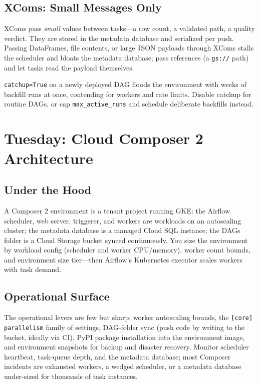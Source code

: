 \subsection{XComs: Small Messages Only}
XComs pass \emph{small} values between tasks---a row count, a validated path, a quality verdict. They are stored in the metadata database and serialized per push. Passing DataFrames, file contents, or large JSON payloads through XComs stalls the scheduler and bloats the metadata database; pass references (a \texttt{gs://} path) and let tasks read the payload themselves.

\begin{pitfall}
\texttt{catchup=True} on a newly deployed DAG floods the environment with weeks of backfill runs at once, contending for workers and rate limits. Disable catchup for routine DAGs, or cap \texttt{max\_active\_runs} and schedule deliberate backfills instead.
\end{pitfall}

\section{Tuesday: Cloud Composer 2 Architecture}

\subsection{Under the Hood}
A Composer 2 environment is a tenant project running GKE: the Airflow scheduler, web server, triggerer, and workers are workloads on an autoscaling cluster; the metadata database is a managed Cloud SQL instance; the DAGs folder is a Cloud Storage bucket synced continuously. You size the environment by workload config (scheduler and worker CPU/memory), worker count bounds, and environment size tier---then Airflow's Kubernetes executor scales workers with task demand.

\subsection{Operational Surface}
The operational levers are few but sharp: worker autoscaling bounds, the \texttt{[core] parallelism} family of settings, DAG-folder sync (push code by writing to the bucket, ideally via CI), PyPI package installation into the environment image, and environment snapshots for backup and disaster recovery. Monitor scheduler heartbeat, task-queue depth, and the metadata database; most Composer incidents are exhausted workers, a wedged scheduler, or a metadata database under-sized for thousands of task instances.

